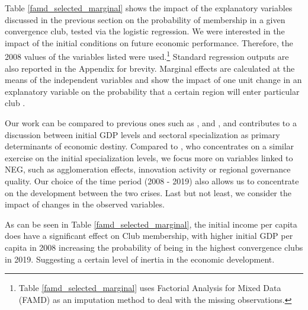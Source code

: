\documentclass[11pt]{article}
\begin{document}
Table \ref{famd_selected_marginal} shows the impact of the explanatory variables discussed in the previous section on the probability of membership in a given convergence club, tested via the logistic regression. We were interested in the impact of the initial conditions on future economic performance. Therefore, the 2008 values of the variables listed were used.\footnote{Table \ref{famd_selected_marginal} uses Factorial Analysis for Mixed Data (FAMD) as an imputation method to deal with the missing observations.} Standard regression outputs are also reported in the Appendix for brevity. Marginal effects are calculated at the means of the independent variables and show the impact of one unit change in an explanatory variable on the probability that a certain region will enter particular club \citep{carrolloglmx}.

Our work can be compared to previous ones such as \citet{cutrini2019economic}, \citet{von2017regional} and \citet{bartkowska2012regional}, and contributes to a discussion between initial GDP levels and sectoral specialization as primary determinants of economic destiny. Compared to \citet{cutrini2019economic}, who concentrates on a similar exercise on the initial specialization levels, we focus more on variables linked to NEG, such as agglomeration effects, innovation activity or regional governance quality. Our choice of the time period (2008 - 2019) also allows us to concentrate on the development between the two crises. Last but not least, we consider the impact of changes in the observed variables. 

As can be seen in Table \ref{famd_selected_marginal}, the initial income per capita does have a significant effect on Club membership, with higher initial GDP per capita in 2008 increasing the probability of being in the highest convergence clubs in 2019. Suggesting a certain level of inertia in the economic development.
 
\end{document}
